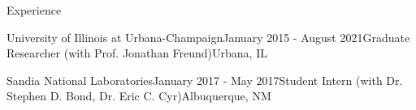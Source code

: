 \documentclass{resume} %
\begin{document}
\begin{rSection}{Experience}
\begin{rSubsection}{University of Illinois at Urbana-Champaign}{January 2015 - August 2021}{Graduate Researcher \textnormal{(with Prof. Jonathan Freund)}}{Urbana, IL}
\item[]
\vspace{-20pt}
\end{rSubsection}

\begin{rSubsection}{Sandia National Laboratories}{January 2017 - May 2017}{Student Intern \textnormal{(with Dr. Stephen D. Bond, Dr. Eric C. Cyr)}}{Albuquerque, NM}
\item[]
\vspace{-20pt}
\end{rSubsection}

\end{rSection}
\end{document}
